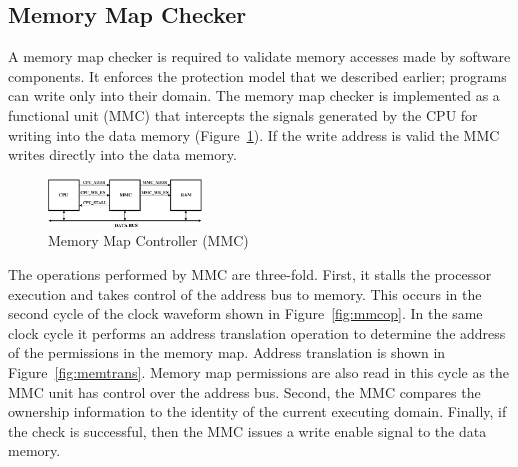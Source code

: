 \subsection{Memory Map Checker}
%
A memory map checker is required to validate memory accesses made by software components.
%
It enforces the protection model that we described earlier; programs can write only into their domain.
%
The memory map checker is implemented as a functional unit (MMC) that intercepts the signals generated by the CPU for writing into the data memory (Figure~\ref{fig:mmcramcpu}).
%
If the write address is valid the MMC writes directly into the data memory.
%
\begin{figure}[htbp]
   \centering
   \includegraphics[height=0.5in, keepaspectratio=true]{figures/mmcramcpu.eps} 
   \caption{Memory Map Controller (MMC)}
   \label{fig:mmcramcpu}
\end{figure}
%

The operations performed by MMC are three-fold.
%
First, it stalls the processor execution and takes control of the address bus to memory.
%
This occurs in the second cycle of the clock waveform shown in Figure~\ref{fig:mmcop}.
%
In the same clock cycle it performs an address translation operation to determine the address of the permissions in the memory map.
%
Address translation is shown in Figure~\ref{fig:memtrans}.
%
Memory map permissions are also read in this cycle as the MMC unit has control over the address bus.
%
Second, the MMC compares the ownership information to the identity of the current executing domain.
%
Finally, if the check is successful, then the MMC issues a write enable signal to the data memory.


